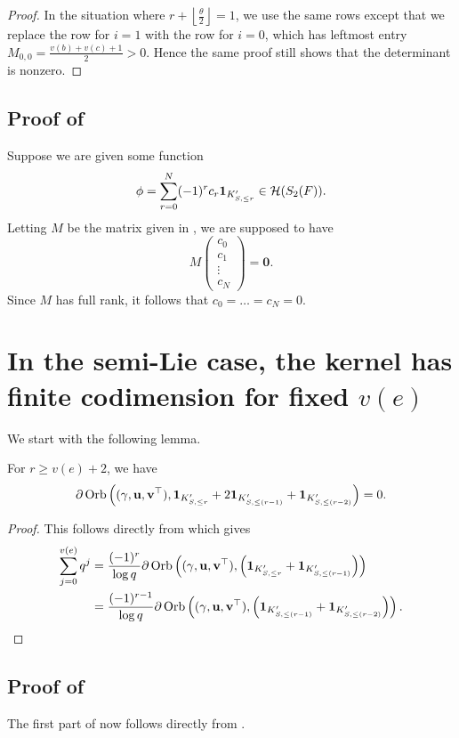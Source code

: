 \begin{proof}
  In the situation where $r + \left\lfloor \frac{\theta}{2} \right\rfloor = 1$,
  we use the same rows except that we replace the row for $i=1$
  with the row for $i=0$, which has leftmost entry $M_{0,0} = \frac{v(b)+v(c)+1}{2} > 0$.
  Hence the same proof still shows that the determinant is nonzero.
\end{proof}

\subsection{Proof of }
Suppose we are given some function
\[ \phi = \sum_{r=0}^N (-1)^r c_r \mathbf{1}_{K'_{S, \le r}} \in \mathcal H(S_2(F)). \]
Letting $M$ be the matrix given in ,
we are supposed to have
\[ M \begin{pmatrix} c_0 \\ c_1 \\ \vdots \\ c_N \end{pmatrix} = \mathbf{0}. \]
Since $M$ has full rank, it follows that $c_0 = \dots = c_N = 0$.

\section{In the semi-Lie case, the kernel has finite codimension for fixed $v(e)$}
We start with the following lemma.
\begin{lemma}
  \label{lem:semi_lie_large_r}
  For $r \ge v(e) + 2$, we have
  \[
    \partial \operatorname{Orb} \left( {(\gamma, \mathbf u, \mathbf v^\top)},
        \mathbf{1}_{K'_{S, \le r}} + 2 \mathbf{1}_{K'_{S, \le (r-1)}} + \mathbf{1}_{K'_{S, \le (r-2)}}
      \right) = 0.
  \]
\end{lemma}
\begin{proof}
  This follows directly from  which gives
  \begin{align*}
    \sum_{j=0}^{v(e)} q^j
    &= \frac{(-1)^r}{\log q} \partial
    \operatorname{Orb} \left( {(\gamma, \mathbf u, \mathbf v^\top)},
      \left(\mathbf{1}_{K'_{S, \le r}} + \mathbf{1}_{K'_{S, \le (r-1)}}\right)
      \right) \\
    &= \frac{(-1)^{r-1}}{\log q} \partial
    \operatorname{Orb} \left( {(\gamma, \mathbf u, \mathbf v^\top)},
      \left(\mathbf{1}_{K'_{S, \le (r-1)}} + \mathbf{1}_{K'_{S, \le (r-2)}}\right)
      \right). \qedhere
  \end{align*}
\end{proof}

\subsection{Proof of }
The first part of  now follows directly from
.

